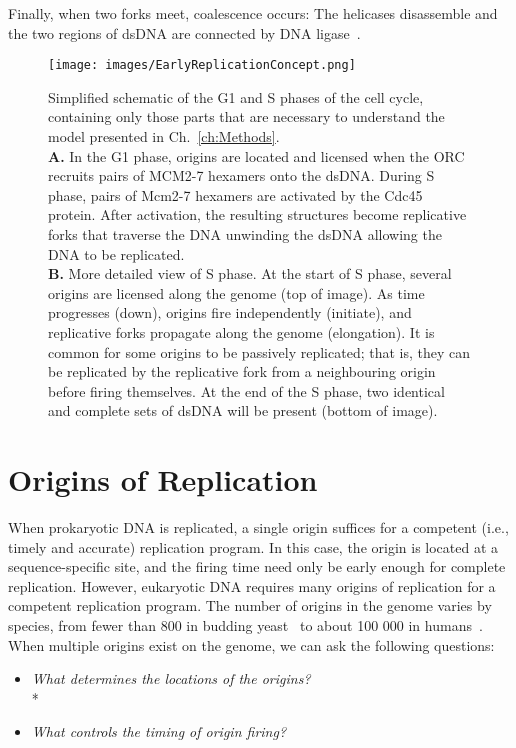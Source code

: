 		Finally, when two forks meet, coalescence occurs:
		The helicases disassemble and the two regions of dsDNA are connected by DNA ligase~\cite{MolecularCellBiology}.
	
	\begin{figure}[tbh]
		\begin{center}
			\texttt{[image: images/EarlyReplicationConcept.png]}
		\end{center}
			\caption[Schematic of G1 and S Phases]{\label{fig:EarlyReplicationConcept} Simplified schematic of the G1 and S phases of the cell cycle, containing only those parts that are necessary to understand the model presented in Ch.~\ref{ch:Methods}.\\
				\textbf{A.} In the G1 phase, origins are located and licensed when the ORC recruits pairs of MCM2-7 hexamers onto the dsDNA.
					During S phase, pairs of Mcm2-7 hexamers are activated by the Cdc45 protein.
					After activation, the resulting structures become replicative forks that traverse the DNA unwinding the dsDNA allowing the DNA to be replicated.\\
				\textbf{B.} More detailed view of S phase.
					At the start of S phase, several origins are licensed along the genome (top of image).
					As time progresses (down), origins fire independently (initiate), and replicative forks propagate along the genome (elongation).
					It is common for some origins to be passively replicated; that is, they can be replicated by the replicative fork from a neighbouring origin before firing themselves.
					At the end of the S phase, two identical and complete sets of dsDNA will be present (bottom of image).}
	\end{figure}
	
	
	\section{Origins of Replication}
	\label{sec:Origins}
	
	When prokaryotic DNA is replicated, a single origin suffices for a competent (i.e., timely and accurate) replication program.
	In this case, the origin is located at a sequence-specific site, and the firing time need only be early enough for complete replication.
	However, eukaryotic DNA requires many origins of replication for a competent replication program.
	The number of origins in the genome varies by species, from fewer than 800 in budding yeast~\cite{OriDB} to about 100 000 in humans~\cite{OriginsReview}.
	When multiple origins exist on the genome, we can ask the following questions:
	\begin{itemize}
		\item \emph{What determines the locations of the origins?}\\*
		\item \emph{What controls the timing of origin firing?}
	\end{itemize}
	
